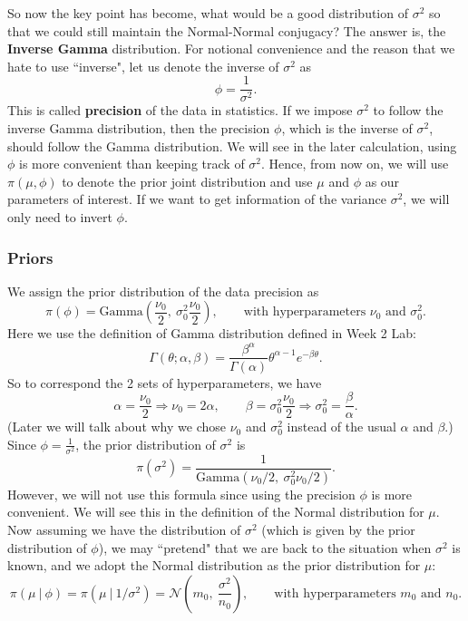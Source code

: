 \documentclass{article}
\def\dsst{\displaystyle}
\begin{document}
So now the key point has become, what would be a good distribution of $\sigma^2$ so that we could still maintain the Normal-Normal conjugacy? The answer is, the \textbf{Inverse Gamma} distribution. For notional convenience and the reason that we hate to use ``inverse", let us denote the inverse of $\sigma^2$ as
$$\phi= \frac{1}{\sigma^2}.$$
This is called \textbf{precision} of the data in statistics. If we impose $\sigma^2$ to follow the inverse Gamma distribution, then the precision $\phi$, which is the inverse of $\sigma^2$, should follow the Gamma distribution. We will see in the later calculation, using $\phi$ is more convenient than keeping track of $\sigma^2$. Hence, from now on, we will use $\pi(\mu, \phi)$ to denote the prior joint distribution and use $\mu$ and $\phi$ as our parameters of interest. If we want to get information of the variance $\sigma^2$, we will only need to invert $\phi$. 

\subsubsection*{Priors}

We assign the prior distribution of the data precision as
$$ \pi(\phi) = \text{Gamma}\left(\frac{\nu_0}{2},\  \sigma_0^2\frac{\nu_0}{2}\right),\qquad \text{with hyperparameters $\nu_0$ and $\sigma_0^2$}. $$
Here we use the definition of Gamma distribution defined in Week 2 Lab:
$$ \Gamma(\theta; \alpha, \beta) = \frac{\beta^\alpha}{\Gamma(\alpha)}\theta^{\alpha-1}e^{-\beta\theta}. $$
So to correspond the 2 sets of hyperparameters, we have
$$ \alpha = \frac{\nu_0}{2}\Longrightarrow \nu_0 = 2\alpha,\qquad \beta = \sigma_0^2\frac{\nu_0}{2}\Longrightarrow \sigma_0^2 = \frac{\beta}{\alpha}. $$
(Later we will talk about why we chose $\nu_0$ and $\sigma_0^2$ instead of the usual $\alpha$ and $\beta$.)\\

Since $\dsst \phi = \frac{1}{\sigma^2}$, the prior distribution of $\sigma^2$ is
$$ \pi(\sigma^2) = \frac{1}{\text{Gamma}(\nu_0/2,\ \sigma_0^2\nu_0/2)}.$$
However, we will not use this formula since using the precision $\phi$ is more convenient. We will see this in the definition of the Normal distribution for $\mu$. \\


Now assuming we have the distribution of $\sigma^2$ (which is given by the prior distribution of $\phi$), we may ``pretend" that we are back to the situation when $\sigma^2$ is known, and we adopt the Normal distribution as the prior distribution for $\mu$:
$$ \pi(\mu~|~\phi) = \pi(\mu~|~1/\sigma^2) = \mathcal{N}\left(m_0, \ \frac{\sigma^2}{n_0}\right), \qquad \text{with hyperparameters $m_0$ and $n_0$}. $$
\end{document}
